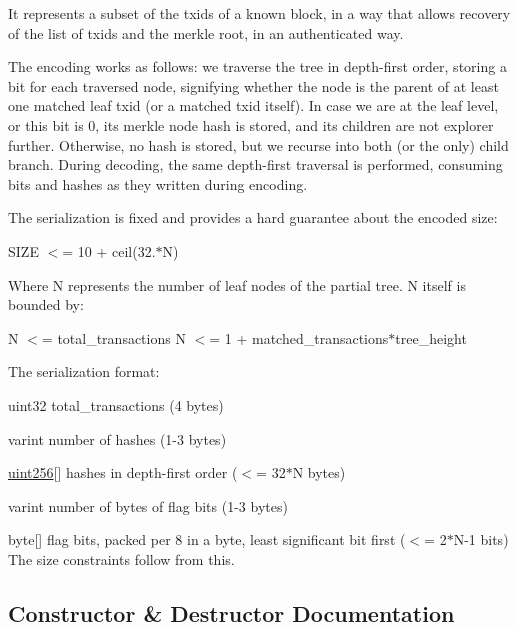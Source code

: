It represents a subset of the txid\textquotesingle{}s of a known block, in a way that allows recovery of the list of txid\textquotesingle{}s and the merkle root, in an authenticated way.

The encoding works as follows\+: we traverse the tree in depth-\/first order, storing a bit for each traversed node, signifying whether the node is the parent of at least one matched leaf txid (or a matched txid itself). In case we are at the leaf level, or this bit is 0, its merkle node hash is stored, and its children are not explorer further. Otherwise, no hash is stored, but we recurse into both (or the only) child branch. During decoding, the same depth-\/first traversal is performed, consuming bits and hashes as they written during encoding.

The serialization is fixed and provides a hard guarantee about the encoded size\+:

S\+I\+Z\+E $<$= 10 + ceil(32.$\ast$\+N)

Where N represents the number of leaf nodes of the partial tree. N itself is bounded by\+:

N $<$= total\+\_\+transactions N $<$= 1 + matched\+\_\+transactions$\ast$tree\+\_\+height

The serialization format\+:
\begin{DoxyItemize}
\item uint32 total\+\_\+transactions (4 bytes)
\item varint number of hashes (1-\/3 bytes)
\item \hyperlink{classuint256}{uint256}\mbox{[}\mbox{]} hashes in depth-\/first order ($<$= 32$\ast$\+N bytes)
\item varint number of bytes of flag bits (1-\/3 bytes)
\item byte\mbox{[}\mbox{]} flag bits, packed per 8 in a byte, least significant bit first ($<$= 2$\ast$\+N-\/1 bits) The size constraints follow from this. 
\end{DoxyItemize}

\subsection{Constructor \& Destructor Documentation}
\hypertarget{class_c_partial_merkle_tree_a0656767dc0d8f3d603c54e5be21d3890}{}
